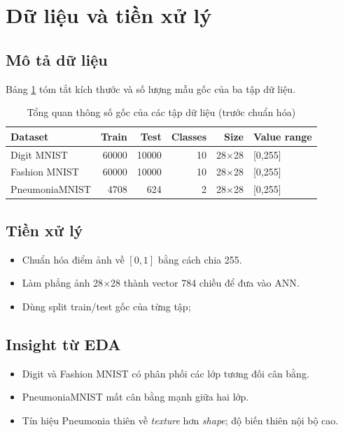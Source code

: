 \documentclass[a4paper,12pt]{report}
\begin{document}
\section{Dữ liệu và tiền xử lý}
\subsection{Mô tả dữ liệu}
Bảng \ref{tab:raw-dataset-summary} tóm tắt kích thước và số lượng mẫu gốc của ba tập dữ liệu.


\begin{table}[H]
    \centering
    \caption{Tổng quan thông số gốc của các tập dữ liệu (trước chuẩn hóa)}
    \label{tab:raw-dataset-summary}
    \begin{tabular}{lrrrrl}
        \toprule
        \textbf{Dataset} & \textbf{Train} & \textbf{Test} & \textbf{Classes} & \textbf{Size} & \textbf{Value range} \\
        \midrule
        Digit MNIST & 60000 & 10000 & 10 & 28$\times$28 & [0,255] \\
        Fashion MNIST & 60000 & 10000 & 10 & 28$\times$28 & [0,255] \\
        PneumoniaMNIST & 4708 & 624 & 2 & 28$\times$28 & [0,255] \\
        \bottomrule
    \end{tabular}
\end{table}

\subsection{Tiền xử lý}
\begin{itemize}
    \item Chuẩn hóa điểm ảnh về $[0,1]$ bằng cách chia 255.
    \item Làm phẳng ảnh 28$\times$28 thành vector 784 chiều để đưa vào ANN.
    \item Dùng split train/test gốc của từng tập;
\end{itemize}

\subsection{Insight từ EDA}
\begin{itemize}
    \item Digit và Fashion MNIST có phân phối các lớp tương đối cân bằng.
    \item PneumoniaMNIST mất cân bằng mạnh giữa hai lớp.
    \item Tín hiệu Pneumonia thiên về \textit{texture} hơn \textit{shape}; độ biến thiên nội bộ cao.
\end{itemize}
\end{document}
